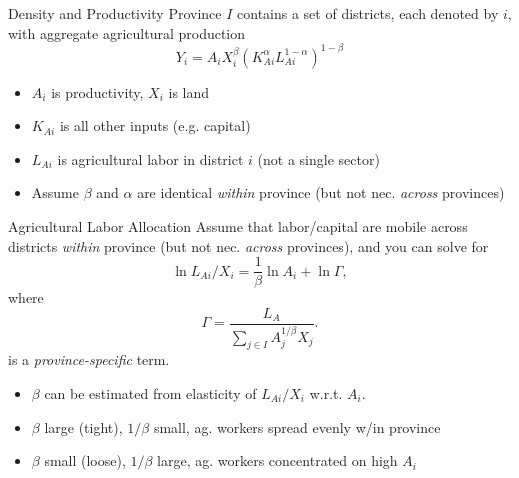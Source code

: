 \documentclass[10pt, xcolor=dvipsnames]{beamer}
\begin{document}
\begin{frame}{Density and Productivity}
Province $I$ contains a set of districts, each denoted by $i$, with aggregate agricultural production
\begin{equation}
Y_{i} = A_{i} X_{i}^{\beta} \left(K_{Ai}^{\alpha}L_{Ai}^{1-\alpha}\right)^{1-\beta} \label{EQ_production}
\end{equation}
\begin{itemize}
  \item $A_i$ is productivity, $X_i$ is land
  \item $K_{Ai}$ is all other inputs (e.g. capital)
  \item $L_{Ai}$ is agricultural labor in district $i$ (not a single sector)
  \item Assume $\beta$ and $\alpha$ are identical \textit{within} province (but not nec. \textit{across} provinces)
\end{itemize}
\end{frame}

\begin{frame}{Agricultural Labor Allocation}
Assume that labor/capital are mobile across districts \textit{within} province (but not nec. \textit{across} provinces), and you can solve for
\begin{equation}
\ln L_{Ai}/X_i = \frac{1}{\beta} \ln A_{i} + \ln \Gamma, \label{EQ_est}
\end{equation}
where
\begin{equation}
    \Gamma = \frac{L_A}{\sum_{j\in I} A_{j}^{1/\beta}X_{j}}.
\end{equation}
is a \textit{province-specific} term. 

\begin{itemize}
  \item $\beta$ can be estimated from elasticity of $L_{Ai}/X_i$ w.r.t. $A_i$. 
  \item $\beta$ large (tight), $1/\beta$ small, ag. workers spread evenly w/in province
  \item $\beta$ small (loose), $1/\beta$ large, ag. workers concentrated on high $A_i$
\end{itemize}
\end{frame}
\end{document}
